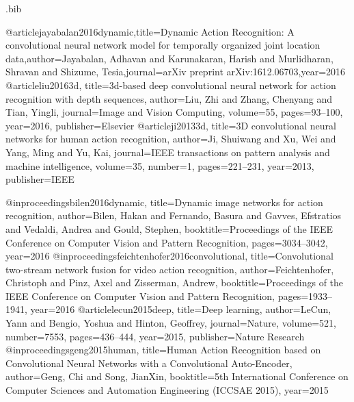 \RequirePackage{filecontents}
\begin{filecontents}{\jobname.bib}

@article{jayabalan2016dynamic,title={Dynamic Action Recognition: A convolutional neural network model for temporally organized joint location data},author={Jayabalan, Adhavan and Karunakaran, Harish and Murlidharan, Shravan and Shizume, Tesia},journal={arXiv preprint arXiv:1612.06703},year={2016}
}
@article{liu20163d,
  title={3d-based deep convolutional neural network for action recognition with depth sequences},
  author={Liu, Zhi and Zhang, Chenyang and Tian, Yingli},
  journal={Image and Vision Computing},
  volume={55},
  pages={93--100},
  year={2016},
  publisher={Elsevier}
}
@article{ji20133d,
  title={3D convolutional neural networks for human action recognition},
  author={Ji, Shuiwang and Xu, Wei and Yang, Ming and Yu, Kai},
  journal={IEEE transactions on pattern analysis and machine intelligence},
  volume={35},
  number={1},
  pages={221--231},
  year={2013},
  publisher={IEEE}
}

@inproceedings{bilen2016dynamic,
  title={Dynamic image networks for action recognition},
  author={Bilen, Hakan and Fernando, Basura and Gavves, Efstratios and Vedaldi, Andrea and Gould, Stephen},
  booktitle={Proceedings of the IEEE Conference on Computer Vision and Pattern Recognition},
  pages={3034--3042},
  year={2016}
}
@inproceedings{feichtenhofer2016convolutional,
  title={Convolutional two-stream network fusion for video action recognition},
  author={Feichtenhofer, Christoph and Pinz, Axel and Zisserman, Andrew},
  booktitle={Proceedings of the IEEE Conference on Computer Vision and Pattern Recognition},
  pages={1933--1941},
  year={2016}
}
@article{lecun2015deep,
  title={Deep learning},
  author={LeCun, Yann and Bengio, Yoshua and Hinton, Geoffrey},
  journal={Nature},
  volume={521},
  number={7553},
  pages={436--444},
  year={2015},
  publisher={Nature Research}
}
@inproceedings{geng2015human,
  title={Human Action Recognition based on Convolutional Neural Networks with a Convolutional Auto-Encoder},
  author={Geng, Chi and Song, JianXin},
  booktitle={5th International Conference on Computer Sciences and Automation Engineering (ICCSAE 2015)},
  year={2015}
}
\end{filecontents}


\documentclass[13 pt]{article}
\usepackage{filecontents}
\usepackage{fancyhdr} %
\usepackage{lastpage} %
\usepackage{graphicx} %
\usepackage{natbib}
\usepackage{bibentry}

\nobibliography*
 

